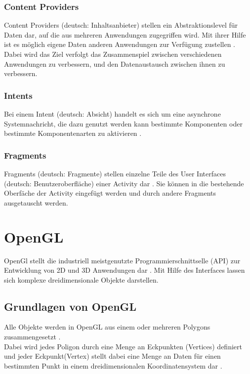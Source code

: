 \subsubsection{Content Providers}
Content Providers (deutsch: \glqq Inhaltsanbieter\grqq ) stellen ein Abstraktionslevel für Daten dar, auf die aus mehreren Anwendungen zugegriffen wird\citep{murphy:beginning-android}. Mit ihrer Hilfe ist es möglich eigene Daten anderen Anwendungen zur Verfügung zustellen \citep{murphy:beginning-android}. \\
Dabei wird das Ziel verfolgt das Zusammenspiel zwischen verschiedenen Anwendungen zu verbessern, und den Datenaustausch zwischen ihnen zu verbessern.

\subsubsection{Intents}
Bei einem Intent (deutsch: \glqq Absicht\grqq ) handelt es sich um eine asynchrone Systemnachricht, die dazu genutzt werden kann bestimmte Komponenten oder bestimmte Komponentenarten zu aktivieren \citep{android:fundamentals}.

\subsubsection{Fragments}
Fragments (deutsch: \glqq Fragmente\grqq) stellen einzelne Teile des User Interfaces (deutsch: \glqq Benutzeroberfläche\grqq) einer Activity dar \citep{android:fragments}. Sie können in die bestehende Oberfäche der Activity eingefügt werden und durch andere Fragments ausgetauscht werden.

\section{OpenGL}\label{OpenGL}
OpenGl stellt die industriell meistgenutzte Programmierschnittselle (API) zur Entwicklung von 2D und 3D Anwendungen dar \citep{khronos:opengl-overview}. Mit Hilfe des Interfaces lassen sich komplexe dreidimensionale Objekte darstellen.

\subsection{Grundlagen von OpenGL}
Alle Objekte werden in OpenGL aus einem oder mehreren Polygons zusammengesetzt \citep[S. 5]{shreiner:opengl}.\\
Dabei wird jedes Poligon durch eine Menge an Eckpunkten (Vertices) definiert und jeder Eckpunkt(Vertex) stellt dabei eine Menge an Daten für einen bestimmten Punkt in einem dreidimensionalen Koordinatensystem dar \citep{vries:learn-opengl-triangle}. 


